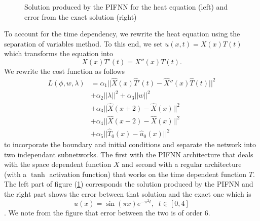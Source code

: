 \documentclass[AMS,STIX1COL]{WileyNJD-v2}
\begin{document}
 \begin{figure}[!htb]
    \centering
    \caption{\;Solution produced by the PIFNN for the heat equation (left) and error from the exact solution (right) }
    \label{fig:fnnvsexactheat}
\end{figure}
To account for the time dependency, we rewrite the heat equation using the separation of variables method. To this end, we set $u(x,t) = X(x)T(t)$ which transforms the equation into 
$$X(x)T'(t) = X''(x)T(t).$$
We rewrite the cost function as follows 
\begin{align*}
    L(\phi, w, \lambda) &= \alpha_1||\hat{X}(x)\hat{T}'(t)-\hat{X}''(x)\hat{T}(t)||^2  \\ &+\alpha_2||\lambda||^2 + \alpha_3||w||^2 \\ 
    &+\alpha_3 ||\hat{X}(x + 2) - \hat{X}(x)||^2 \\
    &+\alpha_4||\hat{X}(x - 2) - \hat{X}(x)||^2  \\
   &+ \alpha_5||\hat{T}_0(x) - \hat{u}_0(x)||^2
\end{align*}
to incorporate the boundary and initial conditions and separate the network into two independant subnetworks. The first with the PIFNN architecture that deals with the space dependent function $X$ and second with a regular architecture (with a $\tanh$ activation function) that works on the time dependent function $T$. The left part of figure (\ref{fig:fnnvsexactheat}) corresponds the solution produced by the PIFNN and the right part shows the error between that solution and the exact one which is $$u(x) = \sin(\pi x)e^{-\pi^2 t}, \;\; t \in [0,4]$$. We note from the figure that error between the two is of order $6$. \\
\end{document}
